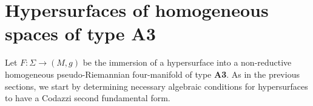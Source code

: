 \documentclass{amsart}
\theoremstyle{plain}
\newtheorem{corollary}{Corollary}
\theoremstyle{remark}
\begin{document}
{%
%



\section{Hypersurfaces of homogeneous spaces of type \textbf{A3}}
\setcounter{equation}{0}
Let $F: \Sigma \to (M,g)$ be the immersion of a hypersurface into a non-reductive homogeneous pseudo-Riemannian four-manifold of type \textbf{A3}. As in the previous sections, we start by determining necessary algebraic conditions for hypersurfaces to have a Codazzi second fundamental form. 

}
\end{document}
